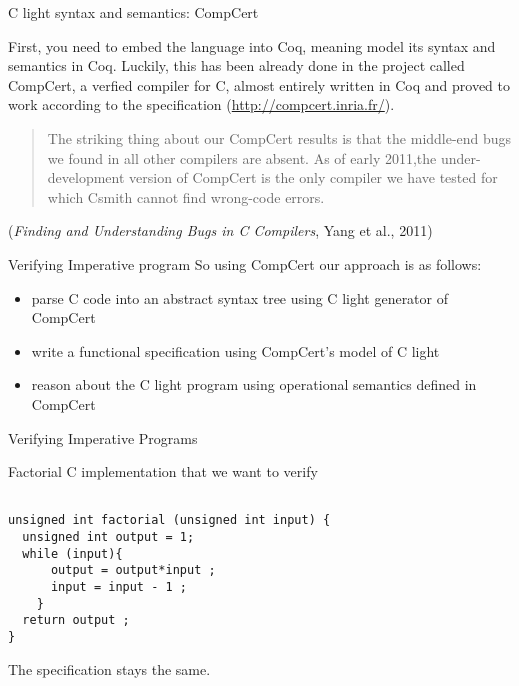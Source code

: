 \documentclass[10pt]{beamer}
\begin{document}
  \begin{frame}{C light syntax and semantics: CompCert}

    First, you need to embed the language into Coq, meaning model its syntax and semantics in Coq. Luckily, this has been already done in the project called CompCert, a verfied compiler for C, almost entirely written in Coq and proved to work according to the specification (\url{http://compcert.inria.fr/}).

    \begin{quote}
      The striking thing about our CompCert results is that the middle-end bugs we found in all other compilers are absent. As of early 2011,the under-development version of CompCert is the only compiler we have tested for which Csmith cannot find wrong-code errors.
    \end{quote} ({\it Finding and Understanding Bugs in C Compilers}, Yang et al., 2011)

  \end{frame}
    
  \begin{frame}{Verifying Imperative program}
    So using CompCert our approach is as follows:
  \begin{itemize}
  \item parse C code into an abstract syntax tree using C light generator of CompCert
  \item write a functional specification using CompCert's model of C light 
  \item reason about the C light program using operational semantics defined in CompCert
\end{itemize}
\end{frame}


\begin{frame}[fragile]{Verifying Imperative Programs}

 Factorial C implementation that we want to verify

\begin{lstlisting}

unsigned int factorial (unsigned int input) {
  unsigned int output = 1;
  while (input){
      output = output*input ;
      input = input - 1 ;
    } 
  return output ;
}

\end{lstlisting}

The specification stays the same. 

\end{frame}
\end{document}
